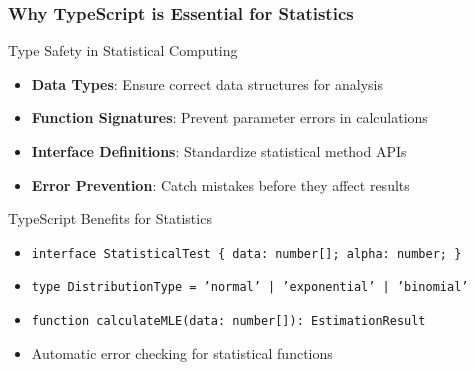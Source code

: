 \documentclass[aspectratio=169]{beamer}
\begin{document}
\begin{frame}
\frametitle{Why TypeScript is Essential for Statistics}
\begin{alertblock}{Type Safety in Statistical Computing}
\begin{itemize}
\item \textbf{Data Types}: Ensure correct data structures for analysis
\item \textbf{Function Signatures}: Prevent parameter errors in calculations
\item \textbf{Interface Definitions}: Standardize statistical method APIs
\item \textbf{Error Prevention}: Catch mistakes before they affect results
\end{itemize}
\end{alertblock}

\begin{exampleblock}{TypeScript Benefits for Statistics}
\begin{itemize}
\item \texttt{interface StatisticalTest \{ data: number[]; alpha: number; \}}
\item \texttt{type DistributionType = 'normal' | 'exponential' | 'binomial'}
\item \texttt{function calculateMLE(data: number[]): EstimationResult}
\item Automatic error checking for statistical functions
\end{itemize}
\end{exampleblock}
\end{frame}
\end{document}
